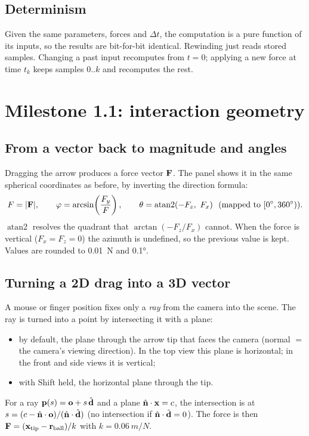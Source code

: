 \documentclass[11pt]{article}
\begin{document}
\subsection{Determinism}
Given the same parameters, forces and $\Delta t$, the computation is a pure function of its inputs, so
the results are bit-for-bit identical. Rewinding just reads stored samples. Changing a past input
recomputes from $t=0$; applying a new force at time $t_k$ keeps samples $0..k$ and recomputes the rest.

\section{Milestone 1.1: interaction geometry}

\subsection{From a vector back to magnitude and angles}
Dragging the arrow produces a force vector $\mathbf{F}$. The panel shows it in the same
spherical coordinates as before, by inverting the direction formula:
\begin{equation}
  F = |\mathbf{F}|,\qquad
  \varphi = \arcsin\!\left(\frac{F_y}{F}\right),\qquad
  \theta = \operatorname{atan2}(-F_z,\ F_x)\ \ (\text{mapped to } [0^\circ, 360^\circ)).
\end{equation}
$\operatorname{atan2}$ resolves the quadrant that $\arctan(-F_z/F_x)$ cannot. When the force is
vertical ($F_x=F_z=0$) the azimuth is undefined, so the previous value is kept. Values are rounded
to \SI{0.01}{N} and \ang{0.1}.

\subsection{Turning a 2D drag into a 3D vector}
A mouse or finger position fixes only a \emph{ray} from the camera into the scene. The ray is
turned into a point by intersecting it with a plane:
\begin{itemize}
  \item by default, the plane through the arrow tip that faces the camera (normal $= $ the camera's
        viewing direction). In the top view this plane is horizontal; in the front and side views it is vertical;
  \item with Shift held, the horizontal plane through the tip.
\end{itemize}
For a ray $\mathbf{p}(s) = \mathbf{o} + s\,\hat{\mathbf{d}}$ and a plane $\hat{\mathbf{n}}\cdot\mathbf{x} = c$, the
intersection is at $s = (c - \hat{\mathbf{n}}\cdot\mathbf{o})/(\hat{\mathbf{n}}\cdot\hat{\mathbf{d}})$ (no intersection if
$\hat{\mathbf{n}}\cdot\hat{\mathbf{d}}=0$). The force is then $\mathbf{F} = (\mathbf{x}_\text{tip} - \mathbf{r}_\text{ball})/k$
with $k = \SI{0.06}{m/N}$.
\end{document}
